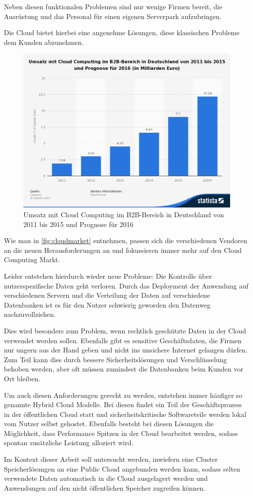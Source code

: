 Neben diesen funktionalen Problemen sind nur wenige Firmen bereit, die Ausrüstung und das Personal für einen eigenen Serverpark aufzubringen.

Die Cloud bietet hierbei eine angenehme Lösungen, diese klassischen Probleme dem Kunden abzunehmen.

\begin{figure}[hbt]
	\centering
	\includegraphics[scale=0.5]{images/cloud-computing-market}
	\caption{Umsatz mit Cloud Computing im B2B-Bereich in Deutschland von 2011 bis 2015 und Prognose für 2016 \parencite{statistia.2015}}
	\label{fig:cloudmarket}
\end{figure}

Wie man in \autoref{fig:cloudmarket} entnehmen, passen sich die verschiedenen Vendoren an die neuen Herausforderungen an und fokussieren immer mehr auf den Cloud Computing Markt.

Leider entstehen hierdurch wieder neue Probleme: Die Kontrolle über nutzerspezifische Daten geht verloren. Durch das Deployment der Anwendung auf verschiedenen Servern und die Verteilung der Daten auf verschiedene Datenbanken ist es für den Nutzer schwierig geworden den Datenweg nachzuvollziehen.

Dies wird besonders zum Problem, wenn rechtlich geschützte Daten in der Cloud verwendet werden sollen. Ebenfalls gibt es sensitive Geschäftsdaten, die Firmen nur ungern aus der Hand geben und nicht ins unsichere Internet gelangen dürfen.
Zum Teil kann dies durch bessere Sicherheitslösungen und Verschlüsselung behoben werden, aber oft müssen zumindest die Datenbanken beim Kunden vor Ort bleiben. 

Um auch diesen Anforderungen gerecht zu werden, entstehen immer häufiger so genannte Hybrid Cloud Modelle. Bei diesen findet ein Teil der Geschäftsprozess in der öffentlichen Cloud statt und sicherheitskritische Softwareteile werden lokal vom Nutzer selbst gehostet. Ebenfalls besteht bei diesen Lösungen die Möglichkeit, dass Performance Spitzen in der Cloud bearbeitet werden, sodass spontan zusätzliche Leistung alloziert wird.

Im Kontext dieser Arbeit soll untersucht werden, inwiefern eine Cluster Speicherlösungen an eine Public Cloud angebunden werden kann, sodass selten verwendete Daten automatisch in die Cloud ausgelagert werden und Anwendungen auf den nicht öffentlichen Speicher zugreifen können.  
